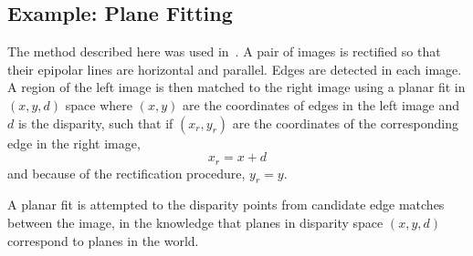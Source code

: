 
\subsection{Example: Plane Fitting} \label{plane_fit_sec}
 The method described here was used in~\cite{McLauchlan_91}.
 A pair of images is rectified so that their epipolar lines are
 horizontal and parallel. Edges are detected in each image.
 A region of the left image is then matched to the right image
 using a planar fit in $(x,y,d)$ space where $(x,y)$ are
 the coordinates of edges in the left image and $d$ is the disparity,
 such that if $(x_r,y_r)$ are the coordinates of the corresponding edge
 in the right image,
 \[ x_r = x + d \]
 and because of the rectification procedure, $y_r=y$.
 
 A planar fit is attempted to the disparity points from candidate
 edge matches between the image, in the knowledge that planes in
 disparity space $(x,y,d)$ correspond to planes in the world.

